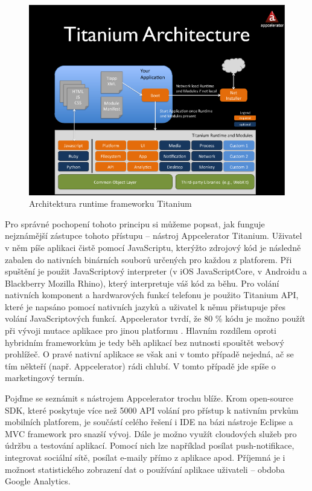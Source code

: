 \begin{figure}\centering
\includegraphics[width=1.0\textwidth]{titanium_architecture.png}
\caption{Architektura runtime frameworku Titanium \cite{architecture_titanium}}
\label{fig:TitaniumArchitecture}
\end{figure}

Pro správné pochopení tohoto principu si můžeme popsat, jak funguje nejznámější zástupce tohoto přístupu – nástroj Appcelerator Titanium. Uživatel v něm píše aplikaci čistě pomocí JavaScriptu, kterýžto zdrojový kód je následně zabalen do nativních binárních souborů určených pro každou z platforem. Při spuštění je použit JavaScriptový interpreter (v iOS JavaScriptCore, v Androidu a Blackberry Mozilla Rhino), který interpretuje váš kód za běhu. Pro volání nativních komponent a hardwarových funkcí telefonu je použito Titanium API, které je napsáno pomocí nativních jazyků a uživatel k němu přistupuje přes volání JavaScriptových funkcí. Appcelerator tvrdí, že 80 \% kódu je možno použít při vývoji mutace aplikace pro jinou platformu \cite{building_apps_titanium}. Hlavním rozdílem oproti hybridním frameworkům je tedy běh aplikací bez nutnosti spouštět webový prohlížeč. O pravé nativní aplikace se však ani v tomto případě nejedná, ač se tím někteří (např. Appcelerator) rádi chlubí. V tomto případě jde spíše o marketingový termín.

Pojďme se seznámit s nástrojem Appcelerator trochu blíže. Krom open-source SDK, které poskytuje více než 5000 API volání pro přístup k nativním prvkům mobilních platforem, je součástí celého řešení i IDE na bázi nástroje Eclipse a MVC framework pro snazší vývoj. Dále je možno využít cloudových služeb pro údržbu a testování aplikací. Pomocí nich lze například posílat push-notifikace, integrovat sociální sítě, posílat e-maily přímo z aplikace apod. Příjemná je i možnost statistického zobrazení dat o používání aplikace uživateli – obdoba Google Analytics. \cite{appcelerator_features} 

